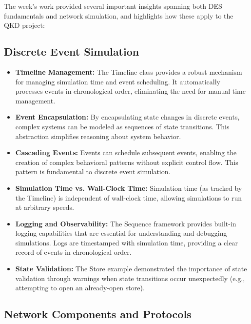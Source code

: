 The week's work provided several important insights spanning both DES fundamentals and network simulation, and highlights how these apply to the QKD project:

\subsection{Discrete Event Simulation}

\begin{itemize}
    \item \textbf{Timeline Management:} The Timeline class provides a robust mechanism for managing simulation time and event scheduling. It automatically processes events in chronological order, eliminating the need for manual time management.
    
    \item \textbf{Event Encapsulation:} By encapsulating state changes in discrete events, complex systems can be modeled as sequences of state transitions. This abstraction simplifies reasoning about system behavior.
    
    \item \textbf{Cascading Events:} Events can schedule subsequent events, enabling the creation of complex behavioral patterns without explicit control flow. This pattern is fundamental to discrete event simulation.
    
    \item \textbf{Simulation Time vs. Wall-Clock Time:} Simulation time (as tracked by the Timeline) is independent of wall-clock time, allowing simulations to run at arbitrary speeds.
    
    \item \textbf{Logging and Observability:} The Sequence framework provides built-in logging capabilities that are essential for understanding and debugging simulations. Logs are timestamped with simulation time, providing a clear record of events in chronological order.
    
    \item \textbf{State Validation:} The Store example demonstrated the importance of state validation through warnings when state transitions occur unexpectedly (e.g., attempting to open an already-open store).
\end{itemize}

\subsection{Network Components and Protocols}

